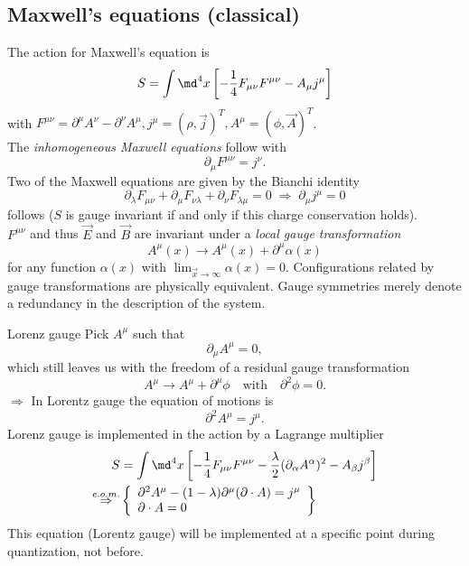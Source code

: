 \subsection{Maxwell's equations (classical) }
The action for Maxwell's equation is 
\begin{equation}
	S = \int \md^4 x \left[-\frac{1}{4} F_{\mu \nu} F^{\mu \nu} - A_{\mu}j^{\mu} \right]
\end{equation}
with $F^{\mu \nu} = \partial^{\mu} A^{\nu}- \partial^{\nu} A^{\mu}, j^{\mu} = (\rho, \vec{j})^T, A^{\mu} = (\phi, \vec{A})^T$.\\
The \emph{inhomogeneous Maxwell equations} follow with
\begin{equation}
	\partial_{\mu} F^{\mu \nu} = j^{\nu}.
\end{equation}
Two of the Maxwell equations are given by the Bianchi identity 
\begin{equation}
	\partial_{\lambda} F_{\mu \nu} + \partial_{\mu} F_{\nu \lambda} + \partial_{\nu} F_{\lambda \mu } = 0 \; \Rightarrow \; \partial_{\mu} j^{\mu} = 0 
\end{equation}
follows ($S$ is gauge invariant if and only if this charge conservation holds).\\
$F^{\mu \nu}$ and thus $\vec{E}$ and $\vec{B}$ are invariant under a \emph{local gauge transformation}
\begin{equation}
	A^{\mu}(x) \rightarrow A^{\mu}(x) + \partial^{\mu} \alpha(x) 
\end{equation}
for any function $\alpha(x)$ with $\lim_{\vec{x}\rightarrow \infty} \alpha(x) =0$. Configurations related by gauge transformations are physically equivalent. Gauge symmetries merely denote a redundancy in the description of the system.
\begin{mybox}{Lorenz gauge}
	Pick $A^{\mu}$ such that 
	\begin{equation}
		\partial_{\mu} A^{\mu} =0,
	\end{equation}
	which still leaves us with the freedom of a residual gauge transformation
	\begin{equation}
		A^{\mu} \rightarrow A^{\mu} + \partial^{\mu} \phi \quad \mathrm{with} \quad \partial^2 \phi =0.
	\end{equation}
	$\Rightarrow$ In Lorentz gauge the equation of motions is
	\begin{equation}
		\partial^2 A^{\mu} = j^{\mu}.
	\end{equation}
	Lorenz gauge is implemented in the action by a Lagrange multiplier
	\begin{align}
		S&= \int \md^4 x \left[- \frac{1}{4} F_{\mu \nu} F^{\mu \nu} - \frac{\lambda}{2} (\partial_{\alpha} A^{\alpha})^2- A_{\beta}j^{\beta}\right]\\
	\stackrel{e.o.m.}{\Rightarrow} & 
	\left\{\begin{array}{lr}
		\partial^2 A^{\mu} - (1-\lambda) \partial^{\mu} (\partial \cdot A) = j^{\mu} \\
		\partial \cdot A = 0
	\end{array}
	\right\}
	\end{align}
This equation (Lorentz gauge) will be implemented at a specific point during quantization, not before.
\end{mybox}

